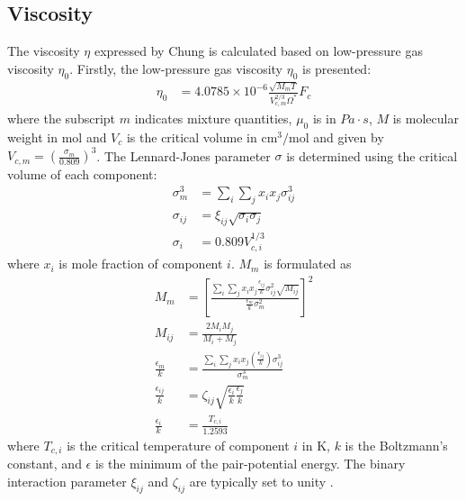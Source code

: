\subsection{Viscosity}
The viscosity $\eta$ expressed by Chung is calculated based on low-pressure gas viscosity $\eta_0$.
Firstly, the low-pressure gas viscosity $\eta_0$ is presented:
\begin{align}
	\eta_0 & = 4.0785 \times 10^{-6} \frac{\sqrt{M_mT}}{V_{c,m}^{2/3}\Omega^*}F_c
\end{align}
where the subscript $m$ indicates mixture quantities, $\mu_0$ is in $Pa\cdot s$, $M$ is molecular weight in mol and $V_{c}$ is the critical volume in $\text{cm}^3/\text{mol}$ and given by $ V_{c,m} =\left(\frac{\sigma_m}{0.809}\right)^3$. The Lennard-Jones parameter $\sigma$ is determined using the critical volume of each component:
\begin{align}
	\sigma_m^3  & = \sum_i\sum_j x_i x_j \sigma_{ij}^3 \\
	\sigma_{ij} & = \xi_{ij} \sqrt{\sigma_i \sigma_j}  \\
	\sigma_i    & = 0.809 V_{c,i}^{1/3}
\end{align}
where $x_i$ is mole fraction of component $i$.
$M_m$ is formulated as
\begin{align}
	M_m                     & = \left[\frac{\sum_i\sum_j x_i x_j\frac{\epsilon_{ij}}{k}\sigma_{ij}^2\sqrt{M_{ij}}}{\frac{\epsilon_m}{k}\sigma_m^2}\right]^2 \\
	M_{ij}                  & = \frac{2M_iM_j}{M_i+M_j}                                                                                                     \\
	\frac{\epsilon_m}{k}    & = \frac{\sum_i\sum_j x_i x_j\left(\frac{\epsilon_{ij}}{k}\right) \sigma_{ij}^3}{\sigma_m^3 }                                  \\
	\frac{\epsilon_{ij}}{k} & = \zeta_{ij} \sqrt{ \frac{\epsilon_{i}}{k} \frac{\epsilon_{j}}{k}}                                                            \\
	\frac{\epsilon_i}{k}    & = \frac{T_{c,i}}{1.2593}
\end{align}
where $T_{c,i}$ is the critical temperature of component $i$ in K, $k$ is the Boltzmann's constant, and $\epsilon$ is the minimum of the pair-potential energy. The binary interaction parameter $\xi_{ij}$ and $\zeta_{ij}$ are typically set to unity \cite{chung1988generalized}.

